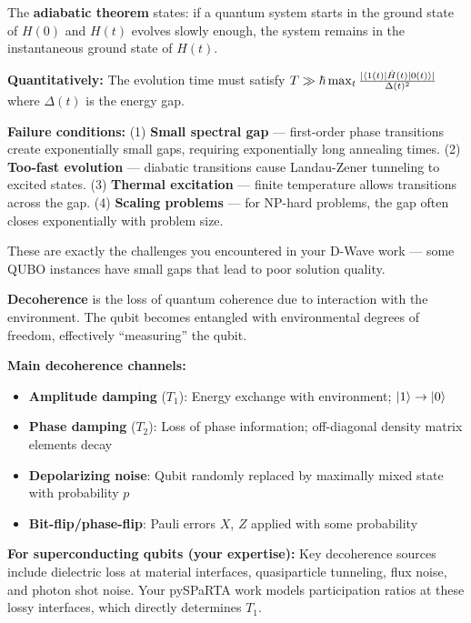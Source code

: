 \documentclass[11pt,a4paper]{article}
\begin{document}
\begin{answerbox}
The \textbf{adiabatic theorem} states: if a quantum system starts in the ground state of $H(0)$ and $H(t)$ evolves slowly enough, the system remains in the instantaneous ground state of $H(t)$.

\textbf{Quantitatively:} The evolution time must satisfy $T \gg \hbar \max_t \frac{|\bra{1(t)} \dot{H}(t) \ket{0(t)}|}{\Delta(t)^2}$ where $\Delta(t)$ is the energy gap.

\textbf{Failure conditions:} (1) \textbf{Small spectral gap} --- first-order phase transitions create exponentially small gaps, requiring exponentially long annealing times. (2) \textbf{Too-fast evolution} --- diabatic transitions cause Landau-Zener tunneling to excited states. (3) \textbf{Thermal excitation} --- finite temperature allows transitions across the gap. (4) \textbf{Scaling problems} --- for NP-hard problems, the gap often closes exponentially with problem size.

These are exactly the challenges you encountered in your D-Wave work --- some QUBO instances have small gaps that lead to poor solution quality.
\end{answerbox}

\begin{answerbox}
\textbf{Decoherence} is the loss of quantum coherence due to interaction with the environment. The qubit becomes entangled with environmental degrees of freedom, effectively ``measuring'' the qubit.

\textbf{Main decoherence channels:}
\begin{itemize}
    \item \textbf{Amplitude damping} ($T_1$): Energy exchange with environment; $\ket{1} \to \ket{0}$
    \item \textbf{Phase damping} ($T_2$): Loss of phase information; off-diagonal density matrix elements decay
    \item \textbf{Depolarizing noise}: Qubit randomly replaced by maximally mixed state with probability $p$
    \item \textbf{Bit-flip/phase-flip}: Pauli errors $X$, $Z$ applied with some probability
\end{itemize}

\textbf{For superconducting qubits (your expertise):} Key decoherence sources include dielectric loss at material interfaces, quasiparticle tunneling, flux noise, and photon shot noise. Your pySPaRTA work models participation ratios at these lossy interfaces, which directly determines $T_1$.
\end{answerbox}
\end{document}
